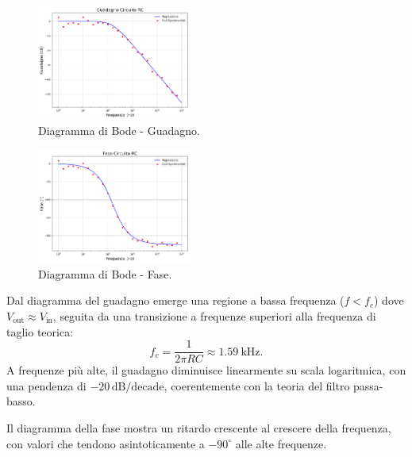 \documentclass[a4paper,10pt]{article}
\begin{document}
\begin{multicols}{2}

\begin{figure}[H]
\centering
\includegraphics[width=0.45\textwidth]{assets/III/guadagno.png}
\caption{Diagramma di Bode - Guadagno.}
\label{fig:bode_gain}
\end{figure}

\begin{figure}[H]
\centering
\includegraphics[width=0.45\textwidth]{assets/III/fase.png}
\caption{Diagramma di Bode - Fase.}
\label{fig:bode_phase}
\end{figure}

\end{multicols}

Dal diagramma del guadagno emerge una regione a bassa frequenza (\(f < f_c\)) dove \(V_{\text{out}} \approx V_{\text{in}}\), seguita da una transizione a frequenze superiori alla frequenza di taglio teorica:
\[
f_c = \frac{1}{2 \pi RC} \approx \SI{1.59}{\kilo\hertz}.
\]
A frequenze più alte, il guadagno diminuisce linearmente su scala logaritmica, con una pendenza di \(-20 \, \si{\deci\bel}/\text{decade}\), coerentemente con la teoria del filtro passa-basso.

Il diagramma della fase mostra un ritardo crescente al crescere della frequenza, con valori che tendono asintoticamente a \(-90^\circ\) alle alte frequenze.
\end{document}
